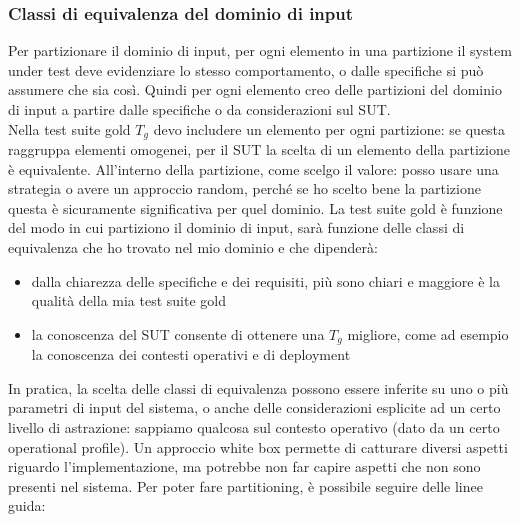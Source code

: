 \documentclass{article}
\begin{document}
\subsubsection{Classi di equivalenza del dominio di input}
Per partizionare il dominio di input, per ogni elemento in una partizione il system under test deve evidenziare lo stesso comportamento, o dalle specifiche si può assumere che sia così. Quindi per ogni elemento creo delle partizioni del dominio di input a partire dalle specifiche o da considerazioni sul SUT.\\ Nella test suite gold $T_g$ devo includere un elemento per ogni partizione: se questa raggruppa elementi omogenei, per il SUT la scelta di un elemento della partizione è equivalente. All'interno della partizione, come scelgo il valore: posso usare una strategia o avere un approccio random, perché se ho scelto bene la partizione questa è sicuramente significativa per quel dominio. La test suite gold è funzione del modo in cui partiziono il dominio di input, sarà funzione delle classi di equivalenza che ho trovato nel mio dominio e che dipenderà:
\begin{itemize}
\item dalla chiarezza delle specifiche e dei requisiti, più sono chiari e maggiore è la qualità della mia test suite gold
\item la conoscenza del SUT consente di ottenere una $T_g$ migliore, come ad esempio la conoscenza dei contesti operativi e di deployment
\end{itemize}
In pratica, la scelta delle classi di equivalenza possono essere inferite su uno o più parametri di input del sistema, o anche delle considerazioni esplicite ad un certo livello di astrazione: sappiamo qualcosa sul contesto operativo (dato da un certo operational profile). Un approccio white box permette di catturare diversi aspetti riguardo l'implementazione, ma potrebbe non far capire aspetti che non sono presenti nel sistema. Per poter fare partitioning, è possibile seguire delle linee guida:
\end{document}
